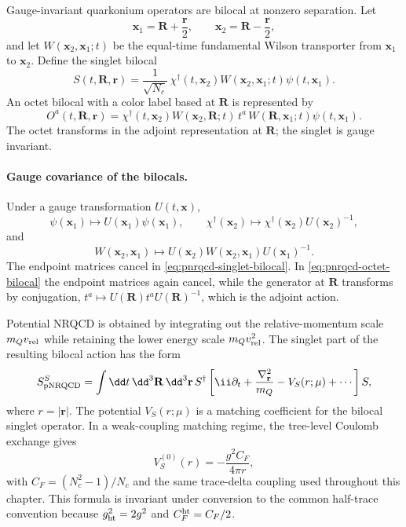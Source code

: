 Gauge-invariant quarkonium operators are bilocal at nonzero separation.  Let
\[
  \mathbf x_1=\mathbf R+\frac{\mathbf r}{2},
  \qquad
  \mathbf x_2=\mathbf R-\frac{\mathbf r}{2},
\]
and let \(W(\mathbf x_2,\mathbf x_1;t)\) be the equal-time fundamental Wilson
transporter from \(\mathbf x_1\) to \(\mathbf x_2\).  Define the singlet
bilocal
\begin{equation}
  S(t,\mathbf R,\mathbf r)
  =
  \frac1{\sqrt{N_c}}\,
  \chi^\dagger(t,\mathbf x_2)
  W(\mathbf x_2,\mathbf x_1;t)
  \psi(t,\mathbf x_1).
  \label{eq:pnrqcd-singlet-bilocal}
\end{equation}
An octet bilocal with a color label based at \(\mathbf R\) is represented by
\begin{equation}
  O^a(t,\mathbf R,\mathbf r)
  =
  \chi^\dagger(t,\mathbf x_2)
  W(\mathbf x_2,\mathbf R;t)\,
  t^a\,
  W(\mathbf R,\mathbf x_1;t)
  \psi(t,\mathbf x_1).
  \label{eq:pnrqcd-octet-bilocal}
\end{equation}
The octet transforms in the adjoint representation at \(\mathbf R\); the
singlet is gauge invariant.

\paragraph{Gauge covariance of the bilocals.}
Under a gauge transformation \(U(t,\mathbf x)\),
\[
  \psi(\mathbf x_1)\mapsto U(\mathbf x_1)\psi(\mathbf x_1),
  \qquad
  \chi^\dagger(\mathbf x_2)\mapsto
  \chi^\dagger(\mathbf x_2)U(\mathbf x_2)^{-1},
\]
and
\[
  W(\mathbf x_2,\mathbf x_1)
  \mapsto
  U(\mathbf x_2)W(\mathbf x_2,\mathbf x_1)U(\mathbf x_1)^{-1}.
\]
The endpoint matrices cancel in \eqref{eq:pnrqcd-singlet-bilocal}.  In
\eqref{eq:pnrqcd-octet-bilocal} the endpoint matrices again cancel, while the
generator at \(\mathbf R\) transforms by conjugation,
\(t^a\mapsto U(\mathbf R)t^aU(\mathbf R)^{-1}\), which is the adjoint action.

Potential NRQCD is obtained by integrating out the relative-momentum scale
\(m_Qv_{\rm rel}\) while retaining the lower energy scale
\(m_Qv_{\rm rel}^2\).  The singlet part of the resulting bilocal action has
the form
\begin{equation}
  S_{\rm pNRQCD}^{S}
  =
  \int \dd t\,\dd^3\mathbf R\,\dd^3\mathbf r\,
  S^\dagger
  \left[
    \ii\partial_t
    +\frac{\nabla_{\mathbf r}^2}{m_Q}
    -V_S(r;\mu)
    +\cdots
  \right]S ,
  \label{eq:pnrqcd-singlet-action}
\end{equation}
where \(r=|\mathbf r|\).  The potential \(V_S(r;\mu)\) is a matching
coefficient for the bilocal singlet operator.  In a weak-coupling matching
regime, the tree-level Coulomb exchange gives
\begin{equation}
  V_S^{(0)}(r)=-\frac{g^2C_F}{4\pi r},
  \label{eq:pnrqcd-tree-coulomb-potential}
\end{equation}
with \(C_F=(N_c^2-1)/N_c\) and the same trace-delta coupling used throughout
this chapter.  This formula is invariant under conversion to the common
half-trace convention because \(g_{\rm ht}^2=2g^2\) and
\(C_F^{\rm ht}=C_F/2\).

